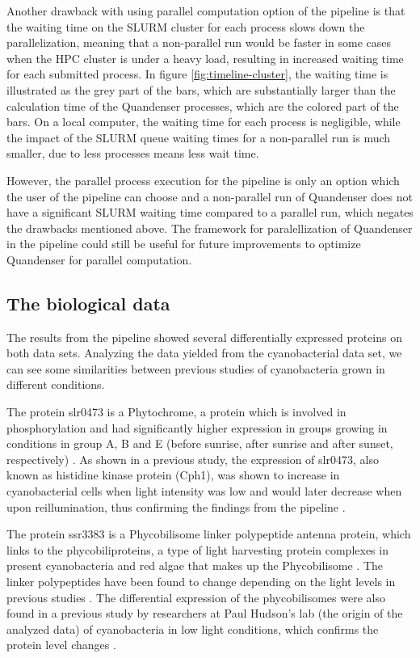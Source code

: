Another drawback with using parallel computation option of the pipeline is that the waiting time on the SLURM cluster for each process slows down the parallelization, meaning that a non-parallel run would be faster in some cases when the HPC cluster is under a heavy load, resulting in increased waiting time for each submitted process. In figure \ref{fig:timeline-cluster}, the waiting time is illustrated as the grey part of the bars, which are substantially larger than the calculation time of the Quandenser processes, which are the colored part of the bars. On a local computer, the waiting time for each process is negligible, while the impact of the SLURM queue waiting times for a non-parallel run is much smaller, due to less processes means less wait time.

However, the parallel process execution for the pipeline is only an option which the user of the pipeline can choose and a non-parallel run of Quandenser does not have a significant SLURM waiting time compared to a parallel run, which negates the drawbacks mentioned above. The framework for paralellization of Quandenser in the pipeline could still be useful for future improvements to optimize Quandenser for parallel computation.

\subsection{The biological data}
The results from the pipeline showed several differentially expressed proteins on both data sets. Analyzing the data yielded from the cyanobacterial data set, we can see some similarities between previous studies of cyanobacteria grown in different conditions.


The protein slr0473 is a Phytochrome, a protein which is involved in phosphorylation and had significantly higher expression in groups growing in conditions in group A, B and E (before sunrise, after sunrise and after sunset, respectively) \cite{phytochrome}. As shown in a previous study, the expression of slr0473, also known as histidine kinase protein (Cph1), was shown to increase in cyanobacterial cells when light intensity was low and would later decrease when upon reillumination, thus confirming the findings from the pipeline \cite{phytochrome-dark}.

The protein ssr3383 is a Phycobilisome linker polypeptide antenna protein, which links to the phycobiliproteins, a type of light harvesting protein complexes in present cyanobacteria and red algae that makes up the Phycobilisome \cite{phycobilisomes}. The linker polypeptides have been found to change depending on the light levels in previous studies \cite{cyano-low-light}. The differential expression of the phycobilisomes were also found in a previous study by researchers at Paul Hudson's lab (the origin of the analyzed data) of cyanobacteria in low light conditions, which confirms the protein level changes \cite{michael-jahn-cyano}.


